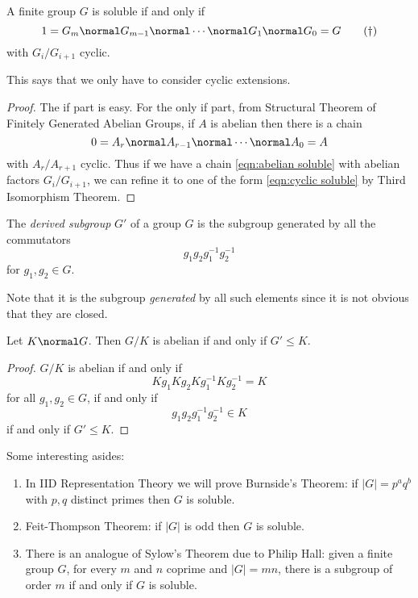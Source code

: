 \documentclass[a4paper]{article}
\begin{document}
\begin{lemma}
  A finite group \(G\) is soluble if and only if
  \begin{equation}
    \label{eqn:cyclic soluble}
    1 = G_m \normal G_{m - 1} \normal \cdots \normal G_1 \normal G_0 = G
    \tag{\(\dag\)}
  \end{equation}
  with \(G_i/G_{i + 1}\) cyclic.
\end{lemma}
This says that we only have to consider cyclic extensions.

\begin{proof}
  The if part is easy. For the only if part, from Structural Theorem of Finitely Generated Abelian Groups, if \(A\) is abelian then there is a chain
  \[
    0 = A_r \normal A_{r - 1} \normal \cdots \normal A_0 = A
  \]
  with \(A_r/A_{r + 1}\) cyclic. Thus if we have a chain \eqref{eqn:abelian soluble} with abelian factors \(G_i/G_{i + 1}\), we can refine it to one of the form \eqref{eqn:cyclic soluble} by Third Isomorphism Theorem.
\end{proof}

\begin{definition}
  The \emph{derived subgroup} \(G'\) of a group \(G\) is the subgroup generated by all the commutators
  \[
    g_1g_2g_1^{-1}g_2^{-1}
  \]
  for \(g_1, g_2 \in G\).
\end{definition}

Note that it is the subgroup \emph{generated} by all such elements since it is not obvious that they are closed.

\begin{lemma}
  Let \(K \normal G\). Then \(G/K\) is abelian if and only if \(G' \leq K\).
\end{lemma}

\begin{proof}
  \(G/K\) is abelian if and only if
  \[
    Kg_1Kg_2Kg_1^{-1}Kg_2^{-1} = K
  \]
  for all \(g_1, g_2 \in G\), if and only if
  \[
    g_1g_2g_1^{-1}g_2^{-1} \in K
  \]
  if and only if \(G' \leq K\).
\end{proof}

\begin{remark}
  Some interesting asides:
  \begin{enumerate}
  \item In IID Representation Theory we will prove Burnside's Theorem: if \(|G| = p^aq^b\) with \(p, q\) distinct primes then \(G\) is soluble.
  \item Feit-Thompson Theorem: if \(|G|\) is odd then \(G\) is soluble.
  \item There is an analogue of Sylow's Theorem due to Philip Hall: given a finite group \(G\), for every \(m\) and \(n\) coprime and \(|G| = mn\), there is a subgroup of order \(m\) if and only if \(G\) is soluble.
  \end{enumerate}
\end{remark}
\end{document}
